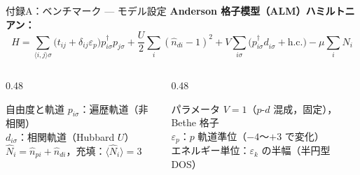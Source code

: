 \documentclass[12pt,aspectratio=169]{beamer}
\begin{document}
\appendix

\begin{frame}{付録A：ベンチマーク — モデル設定}
  \textbf{Anderson 格子模型（ALM）ハミルトニアン：}
  \begin{equation*}
    \hat{H} = \sum_{\langle i,j\rangle\sigma}
      \bigl(t_{ij}+\delta_{ij}\varepsilon_p\bigr)
      p^\dagger_{i\sigma}p^{\phantom\dagger}_{j\sigma}
      +\frac{U}{2}\sum_i(\hat{n}_{di}-1)^2
      +V\sum_{i\sigma}
      \bigl(p^\dagger_{i\sigma}d^{\phantom\dagger}_{i\sigma}+\mathrm{h.c.}\bigr)
      -\mu\sum_i\hat{N}_i
  \end{equation*}

  \begin{columns}[T]
    \begin{column}{0.48\textwidth}
      \begin{block}{自由度と軌道}
        \small
        $p_{i\sigma}$：遍歴軌道（非相関）\\
        $d_{i\sigma}$：相関軌道（Hubbard $U$）\\
        $\hat{N}_i = \hat{n}_{pi}+\hat{n}_{di}$，充填：$\langle\hat{N}_i\rangle=3$
      \end{block}
    \end{column}
    \begin{column}{0.48\textwidth}
      \begin{block}{パラメータ}
        \small
        $V=1$（$p$-$d$ 混成，固定），Bethe 格子\\
        $\varepsilon_p$：$p$ 軌道準位（$-4$～$+3$ で変化）\\
        エネルギー単位：$\varepsilon_k$ の半幅（半円型 DOS）
      \end{block}
    \end{column}
  \end{columns}
\end{frame}
\end{document}
